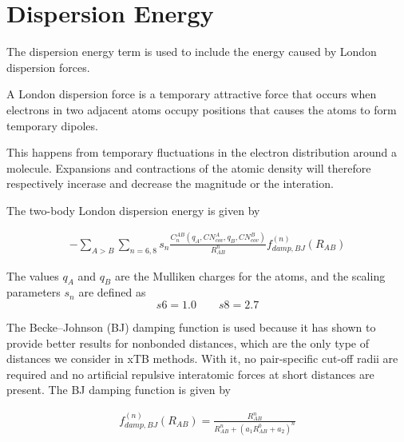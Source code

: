 \section{Dispersion Energy}

The dispersion energy term is used to include the energy caused by London dispersion forces.

A London dispersion force is a temporary attractive force that occurs when electrons in two adjacent atoms occupy positions that causes the atoms to form temporary dipoles\cite{purdue-dispersion}.

This happens from temporary fluctuations in the electron distribution around a molecule. Expansions and contractions of the atomic density will therefore respectively incerase and decrease the magnitude or the interation\cite{bannwarth2019}.



The two-body London dispersion energy is given by

\begin{equation}
\begin{split}
        -\sum_{A>B} \sum_{n=6,8} s_n \frac{C_n^{AB} (q_A, CN^A_{cov}, q_B, CN^B_{cov})}{R^n_{AB}} f^{(n)}_{damp,BJ} (R_{AB})
\end{split}
\end{equation}

The values $q_A$ and $q_B$ are the Mulliken charges for the atoms, and the scaling parameters $s_n$ are defined as
\[
  s6 = 1.0 \quad\quad s8 = 2.7
\]

The Becke–Johnson (BJ) damping function is used because it has shown to provide better results for nonbonded distances\cite{grimme2011}, which are the only type of distances we consider in xTB methods.
With it, no pair-speciﬁc cut-off radii are required and no artiﬁcial repulsive interatomic forces at short distances are present. The BJ damping function is given by

\begin{equation}
\begin{split}
        f_{damp,BJ}^{(n)} (R_{AB}) = \frac{R_{AB}^n}{R_{AB}^n + (a_1 R_{AB}^0 + a_2)^n}\label{eq:damp-bj}\\
\end{split}
\end{equation}

